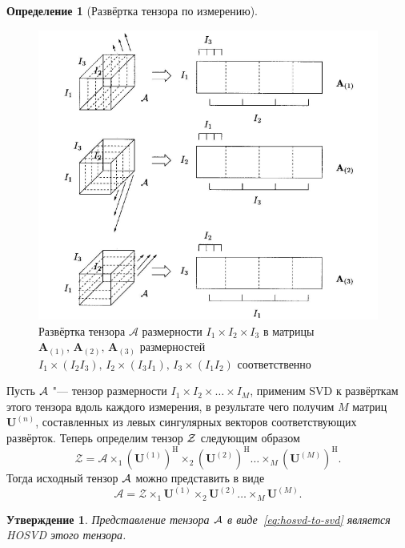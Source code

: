 \documentclass[specialist,
    substylefile = spbu_report.rtx,
    subf,href,colorlinks=true, 12pt]{disser}
\theoremstyle{plain}
\newtheorem{statement}{Утверждение}[section]
\theoremstyle{definition}
\newtheorem{definition}{Определение}[section]
\theoremstyle{remark}
\begin{document}
\begin{definition}[Развёртка тензора по измерению]
        \begin{figure}[!h]
            \centering
            \includegraphics[width=\textwidth]{unfolding}
            \caption{Развёртка тензора $\mathcal{A}$ размерности $I_1\times I_2 \times I_3$ в матрицы $\mathbf{A}_{(1)},\,
            \mathbf{A}_{(2)},\, \mathbf{A}_{(3)}$ размерностей $I_1\times (I_2 I_3),\, I_2\times (I_3 I_1),\, I_3\times (I_1 I_2)$
                соответственно}
            \label{fig:unfolding}
        \end{figure}
    \end{definition}

    Пусть $\mathcal{A}$ "--- тензор размерности $I_1\times I_2\times\ldots\times I_M$, применим SVD к развёрткам этого тензора вдоль каждого
    измерения, в результате чего получим $M$ матриц $\mathbf{U}^{(n)}$,
    составленных из левых сингулярных векторов соответствующих развёрток.
    Теперь определим тензор $\mathcal{Z}$ следующим образом
    \[
        \mathcal{Z}=\mathcal{A}\times_1 \left(\mathbf{U}^{(1)}\right)^\mathrm{H}\times_2 \left(\mathbf{U}^{(2)}\right)^\mathrm{H}\ldots \times_M
        \left(\mathbf{U}^{(M)}\right)^\mathrm{H}.
    \]
    Тогда исходный тензор $\mathcal{A}$ можно представить в виде
    \begin{equation}
        \label{eq:hosvd-to-svd}
        \mathcal{A} = \mathcal{Z}\times_1 \mathbf{U}^{(1)}\times_2 \mathbf{U}^{(2)}\ldots \times_M \mathbf{U}^{(M)}.
    \end{equation}

    \begin{statement}
        Представление тензора $\mathcal{A}$ в виде~\eqref{eq:hosvd-to-svd} является HOSVD этого тензора.
        \label{state:hosvd-to-svd}
    \end{statement}
\end{document}
